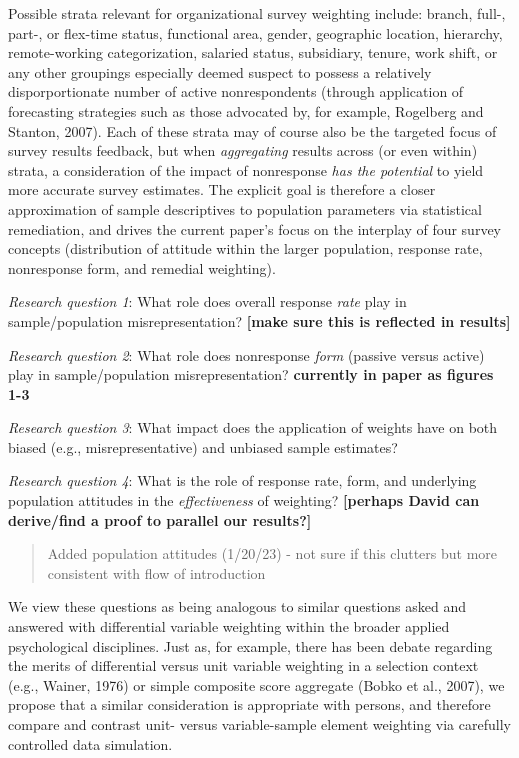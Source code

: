 \documentclass[
  man,mask]{apa7}
\begin{document}
Possible strata relevant for organizational survey weighting include: branch, full-, part-, or flex-time status, functional area, gender, geographic location, hierarchy, remote-working categorization, salaried status, subsidiary, tenure, work shift, or any other groupings especially deemed suspect to possess a relatively disporportionate number of active nonrespondents (through application of forecasting strategies such as those advocated by, for example, Rogelberg and Stanton, 2007). Each of these strata may of course also be the targeted focus of survey results feedback, but when \emph{aggregating} results across (or even within) strata, a consideration of the impact of nonresponse \emph{has the potential} to yield more accurate survey estimates. The explicit goal is therefore a closer approximation of sample descriptives to population parameters via statistical remediation, and drives the current paper's focus on the interplay of four survey concepts (distribution of attitude within the larger population, response rate, nonresponse form, and remedial weighting).

\emph{Research question 1}: What role does overall response \emph{rate} play in sample/population misrepresentation? \textbf{{[}make sure this is reflected in results{]}}

\emph{Research question 2}: What role does nonresponse \emph{form} (passive versus active) play in sample/population misrepresentation? \textbf{currently in paper as figures 1-3}

\emph{Research question 3}: What impact does the application of weights have on both biased (e.g., misrepresentative) and unbiased sample estimates?

\emph{Research question 4}: What is the role of response rate, form, and underlying population attitudes in the \emph{effectiveness} of weighting? \textbf{{[}perhaps David can derive/find a proof to parallel our results?{]}}

\begin{quote}
Added population attitudes (1/20/23) - not sure if this clutters but more consistent with flow of introduction
\end{quote}

We view these questions as being analogous to similar questions asked and answered with differential variable weighting within the broader applied psychological disciplines. Just as, for example, there has been debate regarding the merits of differential versus unit variable weighting in a selection context (e.g., Wainer, 1976) or simple composite score aggregate (Bobko et al., 2007), we propose that a similar consideration is appropriate with persons, and therefore compare and contrast unit- versus variable-sample element weighting via carefully controlled data simulation.
\end{document}
